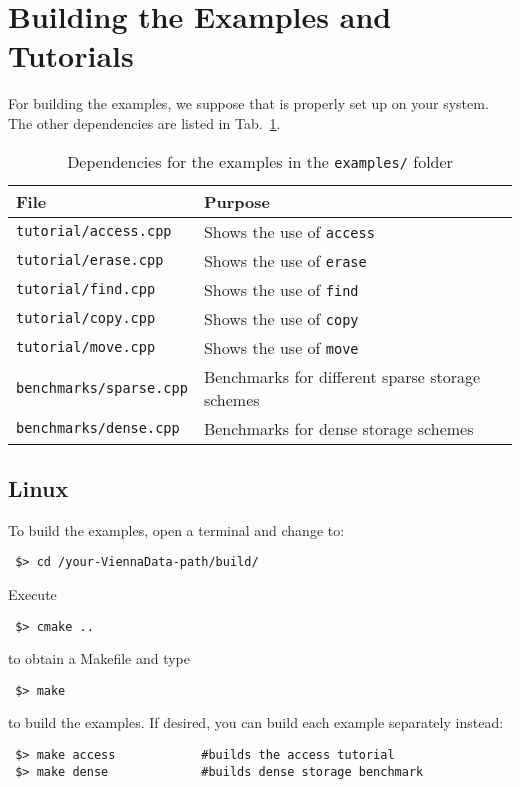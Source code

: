 \section{Building the Examples and Tutorials}
For building the examples, we suppose that {\CMake} is properly set up
on your system. The other dependencies are listed in
Tab.~\ref{tab:tutorial-dependencies}.

\begin{table}[tb]
\begin{center}
\begin{tabular}{l|l}
File & Purpose\\
\hline
\texttt{tutorial/access.cpp}    & Shows the use of \lstinline|access| \\
\texttt{tutorial/erase.cpp}     & Shows the use of \lstinline|erase| \\
\texttt{tutorial/find.cpp}      & Shows the use of \lstinline|find| \\
\texttt{tutorial/copy.cpp}      & Shows the use of \lstinline|copy| \\
\texttt{tutorial/move.cpp}      & Shows the use of \lstinline|move| \\
\texttt{benchmarks/sparse.cpp}  & Benchmarks for different sparse storage schemes \\
\texttt{benchmarks/dense.cpp}   & Benchmarks for dense storage schemes \\
\end{tabular}
\caption{Dependencies for the examples in the \texttt{examples/} folder}
\label{tab:tutorial-dependencies}
\end{center}
\end{table}

\subsection{Linux}
To build the examples, open a terminal and change to:

\begin{lstlisting}
 $> cd /your-ViennaData-path/build/
\end{lstlisting}
Execute
\begin{lstlisting}
 $> cmake ..
\end{lstlisting}
to obtain a Makefile and type
\begin{lstlisting}
 $> make 
\end{lstlisting}
to build the examples. If desired, you can build each example separately instead:
\begin{lstlisting}
 $> make access            #builds the access tutorial
 $> make dense             #builds dense storage benchmark
\end{lstlisting}

